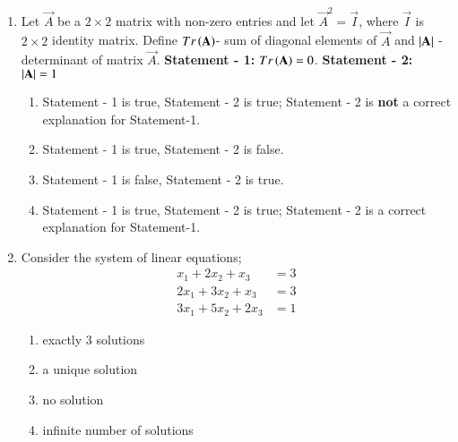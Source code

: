 \documentclass[journal,onecolumn]{IEEEtran}
\theoremstyle{remark}
\begin{document}
\begin{enumerate}
	\begin{enumerate}

	\end{enumerate}

	\item Let $\vec{A}$ be a $2\times2$ matrix with non-zero entries and let $\vec{A}^2 = \vec{I}$, where $\vec{I}$ is $2\times2$ identity matrix. Define 
	\newline
	$Tr\left(\mathbf{A}\right)$- sum of diagonal elements of $\vec{A}$ and
	\newline
	$\left\vert\mathbf{A}\right\vert$ - determinant of matrix $\vec{A}$.
	\newline
	\textbf{Statement - 1:} $Tr\left(\mathbf{A}\right) = 0$.
	\newline
	\textbf{Statement - 2:} $\left\vert\mathbf{A}\right\vert = 1$

	\hfill{\brak{2010}}
	\begin{enumerate}
		\item Statement - 1 is true, Statement - 2 is true; Statement - 2 is \textbf{not} a correct explanation for Statement-1. 
	    	\item Statement - 1 is true, Statement - 2 is false. 
	    	\item Statement - 1 is false, Statement - 2 is true.
	    	\item Statement - 1 is true, Statement - 2 is true; Statement - 2 is a correct explanation for Statement-1. 
	\end{enumerate}

    \item Consider the system of linear equations;
	\begin{align*}
		x_1 + 2x_2 + x_3 &= 3\\
		2x_1 + 3x_2 + x_3 &= 3\\
		3x_1 + 5x_2 + 2x_3 &= 1
	\end{align*}
	\hfill{}{\par}
	\begin{enumerate}
		\item exactly $3$ solutions
	    	\item a unique solution
	    	\item no solution
	    	\item infinite number of solutions
	\end{enumerate}


\end{enumerate}
\end{document}
